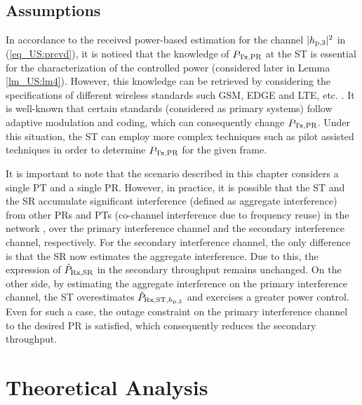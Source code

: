\subsection{Assumptions} \label{ssec_US:as}
In accordance to the received power-based estimation for the channel $|h_{\text{p,3}}|^2$ in (\ref{eq_US:prcvd}), it is noticed that the knowledge of $P_{\text{Tx,PR}}$ at the ST is essential for the characterization of the controlled power (considered later in Lemma \ref{lm_US:lm4}). However, this knowledge can be retrieved by considering the specifications of different wireless standards such GSM, EDGE and LTE, etc. \cite{Sharma14}. It is well-known that certain standards (considered as primary systems) follow adaptive modulation and coding, which can consequently change $P_{\text{Tx,PR}}$. Under this situation, the ST can employ more complex techniques such as pilot assisted techniques in order to determine $P_{\text{Tx,PR}}$ for the given frame.

It is important to note that the scenario described in this chapter considers a single PT and a single PR. However, in practice, it is possible that the ST and the SR accumulate significant interference (defined as aggregate interference) from other PRs and PTs (co-channel interference due to frequency reuse) in the network \cite{Elsawy13_cmag},  over the primary interference channel and the secondary interference channel, respectively. For the secondary interference channel, the only difference is that the SR now estimates the aggregate interference. Due to this, the expression of $\hat{P}_{\text{Rx,SR}}$ in the secondary throughput remains unchanged. On the other side, by estimating the aggregate interference on the primary interference channel, the ST overestimates $\hat{P}_{\text{Rx,ST,$h_{\text{p,3}}$}}$ and exercises a greater power control. Even for such a case, the outage constraint on the primary interference channel to the desired PR is satisfied, which consequently reduces the secondary throughput.  
\section{Theoretical Analysis} \label{sec_US:th_ana}

